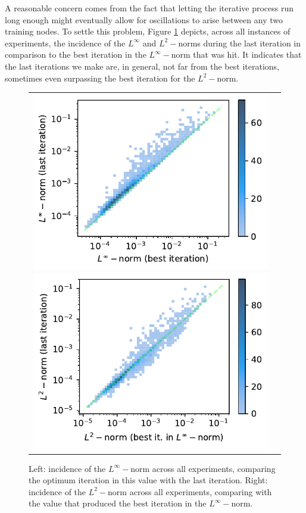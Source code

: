 \documentclass[12pt]{report} %
\begin{document}
A reasonable concern comes from the fact that letting the iterative process run long enough might eventually allow for oscillations to arise between any two training nodes. To settle this problem, Figure \ref{fig:u2-results-incidence-l-norms} depicts, across all instances of experiments, the incidence of the $L^\infty$ and $L^2-$norms during the last iteration in comparison to the best iteration in the $L^\infty-$norm that was hit. It indicates that the last iterations we make are, in general, not far from the best iterations, sometimes even surpassing the best iteration for the $L^2-$norm.

\begin{figure}[h]
  \hspace*{-2cm}
  \begin{tabular}{cc}
    \includegraphics[width=.6\textwidth]{imagenes/experiments/1d/statistical_1d_full_scheduler_interpolation/incidence_of_linf.pdf}
    \includegraphics[width=.6\textwidth]{imagenes/experiments/1d/statistical_1d_full_scheduler_interpolation/incidence_of_l2.pdf}
  \end{tabular}
  \caption{Left: incidence of the $L^\infty-$norm across all experiments, comparing the optimum iteration in this value with the last iteration. Right: incidence of the $L^2-$norm across all experiments, comparing with the value that produced the best iteration in the $L^\infty-$norm.}
  \label{fig:u2-results-incidence-l-norms}
\end{figure}
\end{document}
